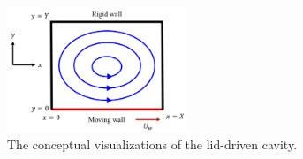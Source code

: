 \begin{figure}[t]
  \vspace{-7mm}
  \centering
  \includegraphics[width=0.48\textwidth]{imgs/lid-driven-cavity.pdf}
  \vspace{-5mm}
  \caption{The conceptual visualizations of the lid-driven cavity.}
  \label{lid-driven-cavity-conceptual}
  \vspace{-3mm}
\end{figure}

